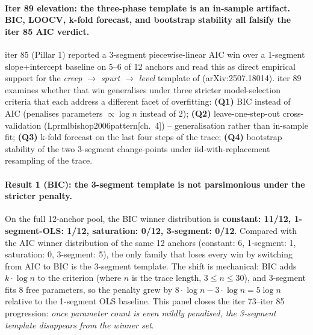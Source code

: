 \paragraph{Iter 89 elevation: the three-phase template is an in-sample
artifact.  BIC, LOOCV, k-fold forecast, and bootstrap stability all
falsify the iter 85 AIC verdict.}
\label{par:scaling-iter89}

iter 85 (Pillar 1) reported a 3-segment piecewise-linear AIC win over a
1-segment slope+intercept baseline on 5--6 of 12 anchors and read this
as direct empirical support for the \emph{creep $\to$ spurt $\to$ level}
template of \citet{nimmaturi2025predictive} (arXiv:2507.18014).  iter 89
examines whether that win generalises under three stricter model-selection
criteria that each address a different facet of overfitting:
\textbf{(Q1)} BIC instead of AIC (penalises parameters $\propto \log n$
instead of $2$); \textbf{(Q2)} leave-one-step-out cross-validation
(Lprml{bishop2006pattern}[ch.~4]) -- generalisation rather than in-sample
fit; \textbf{(Q3)} k-fold forecast on the last four steps of the trace;
\textbf{(Q4)} bootstrap stability of the two 3-segment change-points under
iid-with-replacement resampling of the trace.

\paragraph{Result 1 (BIC): the 3-segment template is not parsimonious
under the stricter penalty.}
\label{par:scaling-iter89-bic}

On the full 12-anchor pool, the BIC winner distribution is
\textbf{constant: 11/12, 1-segment-OLS: 1/12, saturation: 0/12,
3-segment: 0/12}.  Compared with the AIC winner distribution
of the same 12 anchors (constant: 6, 1-segment: 1, saturation: 0,
3-segment: 5), the only family that loses every win by switching from
AIC to BIC is the 3-segment template.  The shift is mechanical: BIC adds
$k \cdot \log n$ to the criterion (where $n$ is the trace length,
$3 \le n \le 30$), and 3-segment fits $8$ free parameters, so the
penalty grew by $8 \cdot \log n - 3 \cdot \log n = 5 \log n$ relative to
the 1-segment OLS baseline.  This panel closes the iter 73--iter 85
progression: \emph{once parameter count is even mildly penalised, the
3-segment template disappears from the winner set}.


